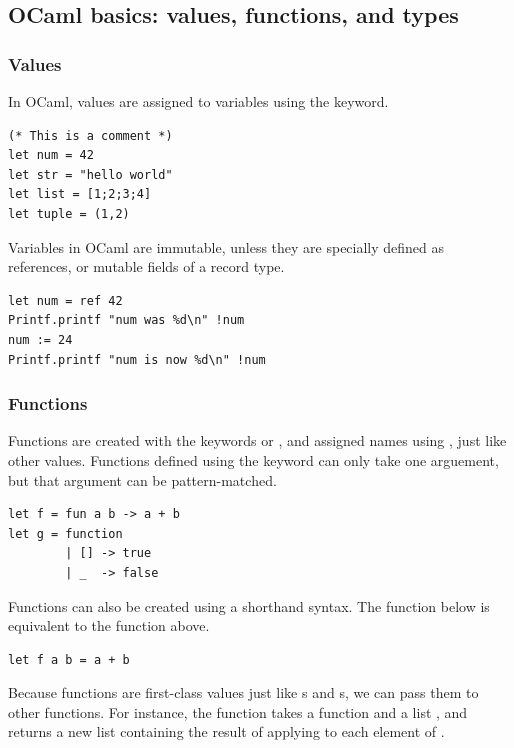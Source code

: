 \subsection{OCaml basics: values, functions, and types}

\subsubsection{Values}

In OCaml, values are assigned to variables using the 
keyword.

\begin{lstlisting}
(* This is a comment *)
let num = 42
let str = "hello world"
let list = [1;2;3;4]
let tuple = (1,2)
\end{lstlisting}

Variables in OCaml are immutable, unless they are specially defined as
references, or mutable fields of a record type.

\begin{lstlisting}
let num = ref 42
Printf.printf "num was %d\n" !num
num := 24
Printf.printf "num is now %d\n" !num
\end{lstlisting}

\subsubsection{Functions}

Functions are created with the keywords  or ,
and assigned names using , just like other values. Functions
defined using the  keyword can only take one arguement,
but that argument can be pattern-matched.

\begin{lstlisting}
let f = fun a b -> a + b
let g = function
        | [] -> true
        | _  -> false
\end{lstlisting}

Functions can also be created using a shorthand  syntax. The
function  below is equivalent to the function  above.

\begin{lstlisting}
let f a b = a + b
\end{lstlisting}

Because functions are first-class values just like s and
s, we can pass them to other functions. For instance, the
function  takes a function  and a list
, and returns a new list containing the result of applying
 to each element of .

